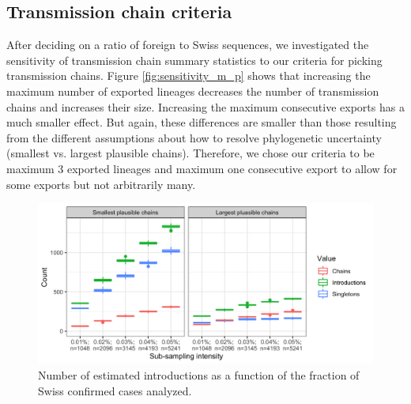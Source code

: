 \documentclass[9pt,twoside,lineno]{pnas-new}
\begin{document}
\subsection{Transmission chain criteria}
After deciding on a ratio of foreign to Swiss sequences, we investigated the sensitivity of transmission chain summary statistics to our criteria for picking transmission chains. Figure \ref{fig:sensitivity_m_p} shows that increasing the maximum number of exported lineages decreases the number of transmission chains and increases their size. Increasing the maximum consecutive exports has a much smaller effect. But again, these differences are smaller than those resulting from the different assumptions about how to resolve phylogenetic uncertainty (smallest vs. largest plausible chains). Therefore, we chose our criteria to be maximum 3 exported lineages and maximum one consecutive export to allow for some exports but not arbitrarily many. 





\begin{figure}
\centering
\includegraphics[width = 11.4cm]{figures/fig_SX_sensitivity_subsampling.png}
\caption{Number of estimated introductions as a function of the fraction of Swiss confirmed cases analyzed.}  
\label{fig:sensitivity_downsampling}
\end{figure}
\end{document}
